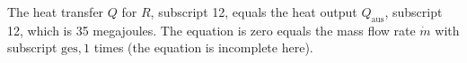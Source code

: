 The heat transfer \( Q \) for \( R \), subscript 12, equals the heat output \( Q_{\text{aus}} \), subscript 12, which is 35 megajoules. The equation is zero equals the mass flow rate \( \dot{m} \) with subscript \( \text{ges},1 \) times (the equation is incomplete here).
